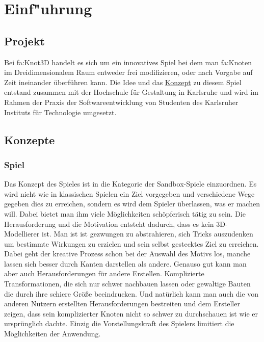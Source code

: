 %
%


\chapter{Einf{"u}hrung}
\label{EF}


\section{Projekt}

Bei \gls{fa:Knot3D} handelt es sich um ein innovatives Spiel bei dem man \gls{fa:Knoten} im Dreidimensionalem Raum entweder frei modifizieren, oder nach Vorgabe auf Zeit ineinander überführen kann.
Die Idee und das \hyperlink{EF:Spielkonzept}{Konzept} zu diesem Spiel entstand zusammen mit der Hochschule für Gestaltung in Karlsruhe und wird im Rahmen der Praxis der Softwareentwicklung von Studenten des Karlsruher Instituts für Technologie umgesetzt.

\section{Konzepte}
\label{EF:Konzepte}

\subsection{Spiel}
\label{EF:Spielkonzept}

Das Konzept des Spieles ist in die Kategorie der Sandbox-Spiele einzuordnen. Es wird nicht wie in klassischen Spielen ein Ziel vorgegeben und verschiedene Wege gegeben dies zu erreichen, sondern es wird dem Spieler überlassen, was er machen will. Dabei bietet man ihm viele Möglichkeiten schöpferisch tätig zu sein. Die Herausforderung und die Motivation entsteht dadurch, dass es kein 3D-Modellierer ist. Man ist ist gezwungen zu abstrahieren, sich Tricks auszudenken um bestimmte Wirkungen zu erzielen und sein selbst gestecktes Ziel zu erreichen. Dabei geht der kreative Prozess schon bei der Auswahl des Motivs los, manche lassen sich besser durch Kanten darstellen als andere.
Genauso gut kann man aber auch Herausforderungen für andere Erstellen. Komplizierte Transformationen, die sich nur schwer nachbauen lassen oder gewaltige Bauten die durch ihre schiere Größe beeindrucken. Und natürlich kann man auch die von anderen Nutzern erstellten Herausforderungen bestreiten und dem Ersteller zeigen, dass sein komplizierter Knoten nicht so schwer zu durchschauen ist wie er ursprünglich dachte.
Einzig die Vorstellungskraft des Spielers limitiert die Möglichkeiten der Anwendung.


